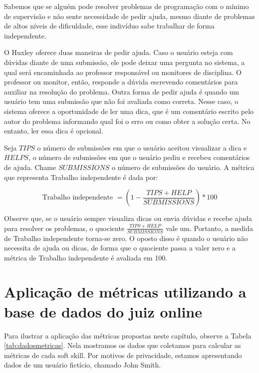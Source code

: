 Sabemos que se alguém pode resolver problemas de programação com o mínimo de supervisão e não sente necessidade de pedir ajuda, mesmo diante de problemas de altos níveis de dificuldade, esse indivíduo sabe trabalhar de forma independente.

O Huxley oferece duas maneiras de pedir ajuda. Caso o usuário esteja com dúvidas diante de uma submissão, ele pode deixar uma pergunta no sistema, a qual será encaminhada ao professor responsável ou monitores de disciplina. O professor ou monitor, então, responde a dúvida escrevendo comentários para auxiliar na resolução do problema. Outra forma de pedir ajuda é quando um usuário tem uma submissão que não foi avaliada como correta. Nesse caso, o sistema oferece a oportunidade de ler uma dica, que é um comentário escrito pelo autor do problema informando qual foi o erro ou como obter a solução certa. No entanto, ler essa dica é opcional.

Seja $TIPS$ o número de submissões em que o usuário aceitou visualizar a dica e $HELPS$, o número de submissões em que o usuário pediu e recebeu comentários de ajuda. Chame $SUBMISSIONS$ o número de submissões do usuário. A métrica que representa Trabalho independente é dada por:

\begin{equation} \label{m:independente}
\mbox{Trabalho independente } = \left(1 - \frac {TIPS + HELP}{SUBMISSIONS}\right) * 100
\end{equation}

Observe que, se o usuário sempre visualiza dicas ou envia dúvidas e recebe ajuda para resolver os problemas, o quociente 
$\frac {TIPS + HELP}{SUBMISSIONS}$ vale um. Portanto, a medida de Trabalho independente torna-se zero.
O oposto disso é quando o usuário não necessita de ajuda ou dicas, de forma que o quociente passa a valer zero e a métrica de Trabalho independente é avaliada em 100.

\section{Aplicação de métricas utilizando a base de dados do juiz online}
\label{sec:exemplo-metricas}

Para ilustrar a aplicação das métricas propostas neste capítulo, observe a Tabela \ref{tab:dadosmetricas}. Nela mostramos os dados que coletamos para calcular as métricas de cada soft skill. Por motivos de privacidade, estamos apresentando dados de um usuário fictício, chamado John Smith.

